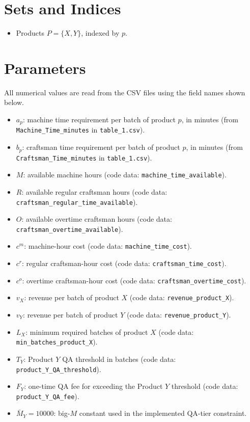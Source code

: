\section*{Sets and Indices}

\begin{itemize}
    \item Products \(P=\{X,Y\}\), indexed by \(p\).
\end{itemize}

\section*{Parameters}

All numerical values are read from the CSV files using the field names shown below.

\begin{itemize}
    \item \(a_p\): machine time requirement per batch of product \(p\), in minutes (from \texttt{Machine\_Time\_minutes} in \texttt{table\_1.csv}).
    \item \(b_p\): craftsman time requirement per batch of product \(p\), in minutes (from \texttt{Craftsman\_Time\_minutes} in \texttt{table\_1.csv}).
    \item \(M\): available machine hours (code data: \texttt{machine\_time\_available}).
    \item \(R\): available regular craftsman hours (code data: \texttt{craftsman\_regular\_time\_available}).
    \item \(O\): available overtime craftsman hours (code data: \texttt{craftsman\_overtime\_available}).
    \item \(c^m\): machine-hour cost (code data: \texttt{machine\_time\_cost}).
    \item \(c^r\): regular craftsman-hour cost (code data: \texttt{craftsman\_time\_cost}).
    \item \(c^o\): overtime craftsman-hour cost (code data: \texttt{craftsman\_overtime\_cost}).
    \item \(v_X\): revenue per batch of product \(X\) (code data: \texttt{revenue\_product\_X}).
    \item \(v_Y\): revenue per batch of product \(Y\) (code data: \texttt{revenue\_product\_Y}).
    \item \(L_X\): minimum required batches of product \(X\) (code data: \texttt{min\_batches\_product\_X}).
    \item \(T_Y\): Product \(Y\) QA threshold in batches (code data: \texttt{product\_Y\_QA\_threshold}).
    \item \(F_Y\): one-time QA fee for exceeding the Product \(Y\) threshold (code data: \texttt{product\_Y\_QA\_fee}).
    \item \(\bar M_Y = 10000\): big-\(M\) constant used in the implemented QA-tier constraint.
\end{itemize}

